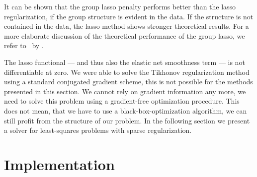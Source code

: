 It can be shown that the group lasso penalty performs better than the lasso
regularization, if the group structure is evident in the data.
If the structure is not contained in the data, the lasso method shows stronger
theoretical results.
For a more elaborate discussion of the theoretical performance of the group lasso, we refer to~\cite{grouplasso-benefit} by \citeauthor{grouplasso-benefit}.

The lasso functional --- and thus also the elastic net smoothness term --- is not differentiable at zero.
We were able to solve the Tikhonov regularization method using a standard conjugated gradient scheme, this is not possible for the methods presented in this section.
We cannot rely on gradient information any more, we need to solve this problem using a gradient-free optimization procedure.
This does not mean, that we have to use a black-box-optimization algorithm, we can still profit from the structure of our problem.
In the following section we present a solver for least-squares problems with
sparse regularization.



\section{Implementation}


